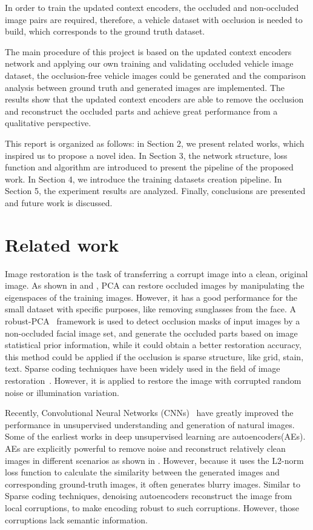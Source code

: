 In order to train the updated context encoders, the occluded and non-occluded image pairs are required, therefore, a vehicle dataset with occlusion is needed to build, which corresponds to the ground truth dataset.

The main procedure of this project is based on the updated context encoders network and applying our own training and validating occluded vehicle image dataset, the occlusion-free vehicle images could be generated and the comparison analysis between ground truth and generated images are implemented. The results show that the updated context encoders are able to remove the occlusion and reconstruct the occluded parts and achieve great performance from a qualitative perspective.

This report is organized as follows: in Section 2, we present related works, which inspired us to propose a novel idea. In Section 3, the network structure, loss function and algorithm are introduced to present the pipeline of the proposed work. In Section 4, we introduce the training datasets creation pipeline. In Section 5, the experiment results are analyzed. Finally, conclusions are presented and future work is discussed.


\section{Related work}
Image restoration is the task of transferring a corrupt image into a clean, original image. As shown in \cite{Hosoi2012RestoringOR} and \cite{819578}, PCA can restore occluded images by manipulating the eigenspaces of the training images. However, it has a good performance for the small dataset with specific purposes, like removing sunglasses from the face. A robust-PCA\ \cite{EURECOM+3712} framework is used to detect occlusion masks of input images by a non-occluded facial image set, and generate the occluded parts based on image statistical prior information, while it could obtain a better restoration accuracy, this method could be applied if the occlusion is sparse structure, like grid, stain, text. Sparse coding techniques have been widely used in the field of image restoration\ \cite{2a88c51341cf4974a9d5025abeb86d0d}. However, it is applied to restore the image with corrupted random noise or illumination variation.

Recently, Convolutional Neural Networks (CNNs)\ \cite{Fukushima1980} have greatly improved the performance in unsupervised understanding and generation of natural images. Some of the earliest works in deep unsupervised learning are autoencoders(AEs). AEs are explicitly powerful to remove noise and reconstruct relatively clean images in different scenarios as shown in \cite{Zhao2018, Sagha2017}.
However, because it uses the L2-norm loss function to calculate the similarity between the generated images and corresponding ground-truth images, it often generates blurry images. Similar to Sparse coding techniques, denoising autoencoders reconstruct the image from local corruptions, to make encoding robust to such corruptions. However, those corruptions lack semantic information.

